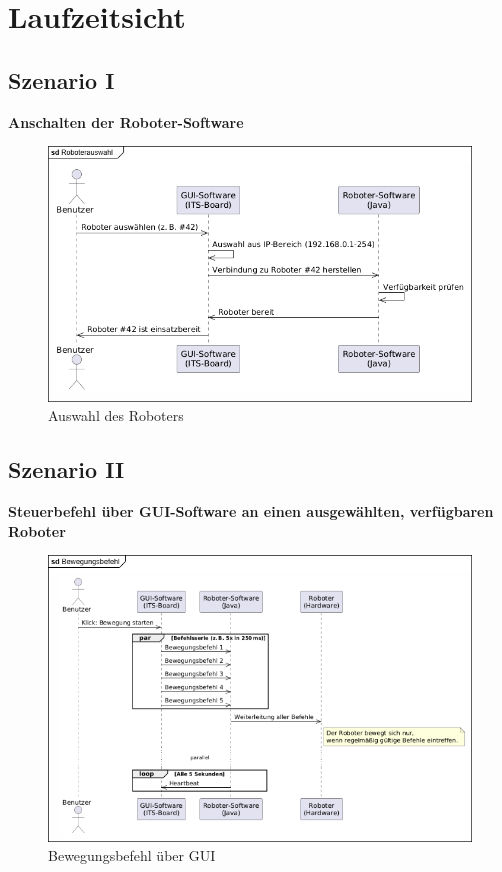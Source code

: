 
\chapter{Laufzeitsicht}

\section{Szenario I}
\textbf{Anschalten der Roboter-Software}\\

\begin{figure}[h]
    \centering
    \includegraphics[width=0.8\linewidth]{diagrams/Roboterauswahl.png}
    \caption{Auswahl des Roboters}
    \label{fig:Auswahl}
\end{figure}

\clearpage
\section{Szenario II}
\textbf{Steuerbefehl über GUI-Software an einen ausgewählten, verfügbaren Roboter}\\

\begin{figure}[h]  
    \centering
    \includegraphics[width=0.8\linewidth]{diagrams/Bewegungsbefehl.png}
    \caption{Bewegungsbefehl über GUI}
    \label{fig:Bewegungsbefehl}
\end{figure}

